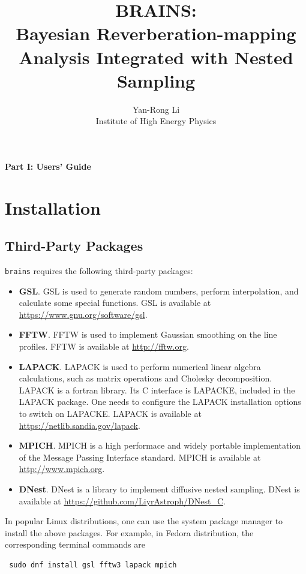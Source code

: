 \documentclass[oneside]{book}
\def\brains{{\texttt{brains}}}
\begin{document}
\title{\bf BRAINS:\\
Bayesian Reverberation-mapping Analysis Integrated
with Nested Sampling}
\author{Yan-Rong Li\\
Institute of High Energy Physics}

\maketitle
\tableofcontents
\mainmatter

\clearpage
\newpage

\vspace*{10cm}
{\Huge\centerline{\bf Part I: Users' Guide}}


\chapter{Installation}
\section{Third-Party Packages}
{\brains} requires the following third-party packages:
\begin{itemize}
 \item {\bf GSL}. GSL is used to generate random numbers, perform interpolation, and calculate some special functions. GSL is available at 
 \url{https://www.gnu.org/software/gsl}.
 
 \item {\bf FFTW}. FFTW is used to implement Gaussian smoothing on the line profiles. FFTW is available at \url{http://fftw.org}.
 
 \item {\bf LAPACK}. LAPACK is used to perform numerical linear algebra calculations, such as matrix operations and Cholesky decomposition.
 LAPACK is a fortran library. Its C interface is LAPACKE, included in the LAPACK package. One needs to configure the LAPACK installation
 options to switch on LAPACKE. LAPACK is available at \url{https://netlib.sandia.gov/lapack}.
 
 \item {\bf MPICH}. MPICH is a high performace and widely portable implementation of the Message Passing Interface standard.
 MPICH is available at \url{http://www.mpich.org}. 
 
 \item {\bf DNest}. DNest is a library to implement diffusive nested sampling. DNest is available at \url{https://github.com/LiyrAstroph/DNest_C}.
\end{itemize}
In popular Linux distributions, one can use the system package manager to install the above packages. For example, in Fedora distribution, 
the corresponding terminal commands are 
\begin{verbatim}
 sudo dnf install gsl fftw3 lapack mpich
\end{verbatim} 
\end{document}

